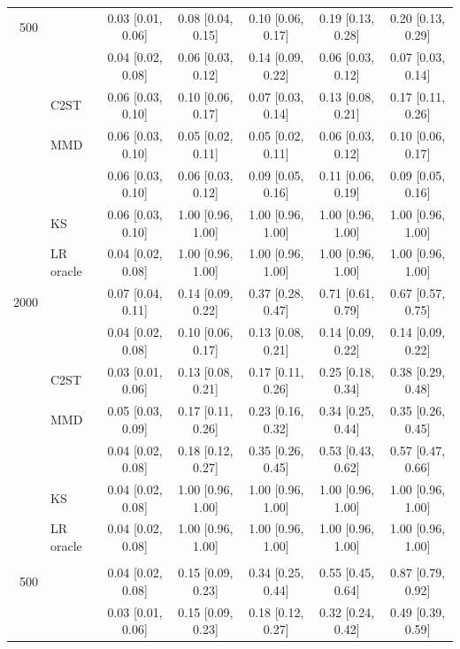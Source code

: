 \begin{tabular}{rlccccc}
500 & \WC{} & 0.03 [0.01, 0.06] & 0.08 [0.04, 0.15] & 0.10 [0.06, 0.17] & 0.19 [0.13, 0.28] & 0.20 [0.13, 0.29] \\
 & \LRC{} & 0.04 [0.02, 0.08] & 0.06 [0.03, 0.12] & 0.14 [0.09, 0.22] & 0.06 [0.03, 0.12] & 0.07 [0.03, 0.14] \\
 & C2ST & 0.06 [0.03, 0.10] & 0.10 [0.06, 0.17] & 0.07 [0.03, 0.14] & 0.13 [0.08, 0.21] & 0.17 [0.11, 0.26] \\
 & MMD & 0.06 [0.03, 0.10] & 0.05 [0.02, 0.11] & 0.05 [0.02, 0.11] & 0.06 [0.03, 0.12] & 0.10 [0.06, 0.17] \\
 & \SigMMD{} & 0.06 [0.03, 0.10] & 0.06 [0.03, 0.12] & 0.09 [0.05, 0.16] & 0.11 [0.06, 0.19] & 0.09 [0.05, 0.16] \\
 & KS & 0.06 [0.03, 0.10] & 1.00 [0.96, 1.00] & 1.00 [0.96, 1.00] & 1.00 [0.96, 1.00] & 1.00 [0.96, 1.00] \\
 & LR oracle & 0.04 [0.02, 0.08] & 1.00 [0.96, 1.00] & 1.00 [0.96, 1.00] & 1.00 [0.96, 1.00] & 1.00 [0.96, 1.00] \\
2000 & \WC{} & 0.07 [0.04, 0.11] & 0.14 [0.09, 0.22] & 0.37 [0.28, 0.47] & 0.71 [0.61, 0.79] & 0.67 [0.57, 0.75] \\
 & \LRC{} & 0.04 [0.02, 0.08] & 0.10 [0.06, 0.17] & 0.13 [0.08, 0.21] & 0.14 [0.09, 0.22] & 0.14 [0.09, 0.22] \\
 & C2ST & 0.03 [0.01, 0.06] & 0.13 [0.08, 0.21] & 0.17 [0.11, 0.26] & 0.25 [0.18, 0.34] & 0.38 [0.29, 0.48] \\
 & MMD & 0.05 [0.03, 0.09] & 0.17 [0.11, 0.26] & 0.23 [0.16, 0.32] & 0.34 [0.25, 0.44] & 0.35 [0.26, 0.45] \\
 & \SigMMD{} & 0.04 [0.02, 0.08] & 0.18 [0.12, 0.27] & 0.35 [0.26, 0.45] & 0.53 [0.43, 0.62] & 0.57 [0.47, 0.66] \\
 & KS & 0.04 [0.02, 0.08] & 1.00 [0.96, 1.00] & 1.00 [0.96, 1.00] & 1.00 [0.96, 1.00] & 1.00 [0.96, 1.00] \\
 & LR oracle & 0.04 [0.02, 0.08] & 1.00 [0.96, 1.00] & 1.00 [0.96, 1.00] & 1.00 [0.96, 1.00] & 1.00 [0.96, 1.00] \\
\addlinespace[3pt]
\multicolumn{7}{@{}l}{\emph{(c) volatility clustering, $a+b$: 0.98, 0.95, 0.90, 0.80, 0}} \\
500 & \WC{} & 0.04 [0.02, 0.08] & 0.15 [0.09, 0.23] & 0.34 [0.25, 0.44] & 0.55 [0.45, 0.64] & 0.87 [0.79, 0.92] \\
 & \LRC{} & 0.03 [0.01, 0.06] & 0.15 [0.09, 0.23] & 0.18 [0.12, 0.27] & 0.32 [0.24, 0.42] & 0.49 [0.39, 0.59] \\

\end{tabular}
